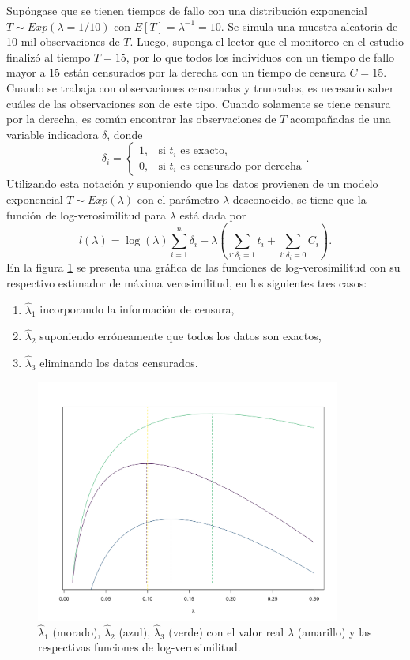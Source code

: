 \documentclass[11pt,a4paper]{article}
\begin{document}
\newpage

Supóngase que se tienen tiempos de fallo con una distribución exponencial $T \sim Exp(\lambda = 1/10)$ con $E[T] = \lambda^{-1} = 10$. Se simula una muestra aleatoria de 10 mil observaciones de $T$. Luego, suponga el lector que el monitoreo en el estudio finalizó al tiempo $T = 15$, por lo que todos los individuos con un tiempo de fallo mayor a 15 están censurados por la derecha con un tiempo de censura $C = 15$. Cuando se trabaja con observaciones censuradas y truncadas, es necesario saber cuáles de las observaciones son de este tipo. Cuando solamente se tiene censura por la derecha, es común encontrar las observaciones de $T$ acompañadas de una variable indicadora $\delta$, donde $$\delta_i = \begin{cases}
1, & \text{si } t_i \text{ es exacto},\\
0, & \text{si } t_i \text{ es censurado por derecha}
\end{cases}.$$ Utilizando esta notación y suponiendo que los datos provienen de un modelo exponencial $T\sim Exp(\lambda)$ con el parámetro $\lambda$ desconocido, se tiene que la función de log-verosimilitud para $\lambda$ está dada por $$l(\lambda) = \log (\lambda) \sum_{i = 1}^n \delta_i - \lambda \left(\sum_{i: \delta_i = 1} t_i + \sum_{i: \delta_i = 0} C_i\right).$$ En la figura \ref{fig:lik} se presenta una gráfica de las funciones de log-verosimilitud con su respectivo estimador de máxima verosimilitud, en los siguientes tres casos:
\begin{enumerate}
\item $\hat{\lambda}_1$ incorporando la información de censura,
\item $\hat{\lambda}_2$ suponiendo erróneamente que todos los datos son exactos,
\item $\hat{\lambda}_3$ eliminando los datos censurados.
\end{enumerate}

\begin{figure}[htb]
\centering\includegraphics[width=10cm]{likelihood.png}
\caption{$\hat{\lambda}_1$ (morado), $\hat{\lambda}_2$ (azul), $\hat{\lambda}_3$ (verde) con el valor real $\lambda$ (amarillo) y las respectivas funciones de log-verosimilitud.}
\label{fig:lik}
\end{figure}
\end{document}
